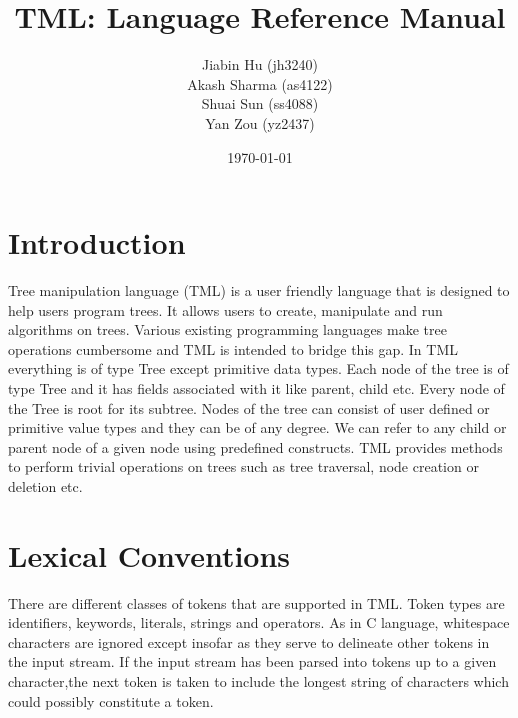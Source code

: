 \documentclass[12pt,psfig,a4]{article}
\begin{document}
 
\pagestyle{plain} 
\newenvironment{code}
{\sffamily
 \setlength{\parskip}{0pt}
}
{}


\title{TML: Language Reference Manual}
\author{
Jiabin Hu (jh3240)\\
Akash Sharma (as4122)\\
Shuai Sun (ss4088)\\
Yan Zou (yz2437)
}
\date{\today}
\maketitle





\section{Introduction}

Tree manipulation language (TML) is a user friendly language that is designed to help users program trees. It allows users to create, manipulate and run algorithms on trees. Various existing programming languages make tree operations cumbersome and TML is intended to bridge this gap. In TML everything is of type Tree except primitive data types. Each node of the tree is of type Tree and it has fields associated with it like parent, child etc. Every node of the Tree is root for its subtree. Nodes of the tree can consist of user defined or primitive value types and they can be of any degree. We can refer to any child or parent node of a given node using predefined constructs. TML provides methods to perform trivial operations on trees such as tree traversal, node creation or deletion etc.

\section{Lexical Conventions} \label{lexCon}
There are different classes of tokens that are supported in TML. Token types are identifiers, keywords, literals, strings and operators. As in C language, whitespace characters are ignored except insofar as they serve to delineate other tokens in the input stream. If the input stream has been parsed into tokens up to a given character,the next token is taken to include the longest string of characters which could possibly constitute a token.
\end{document}
